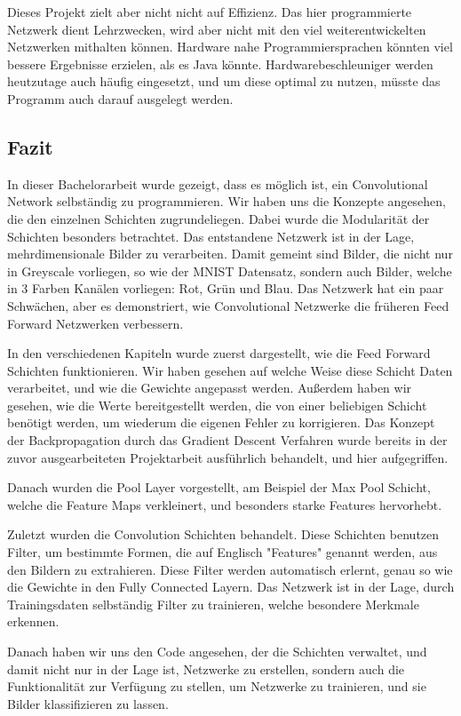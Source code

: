 \documentclass[12pt]{article}
\begin{document}
Dieses Projekt zielt aber nicht nicht auf Effizienz. Das hier programmierte Netzwerk dient Lehrzwecken, wird aber nicht mit den viel weiterentwickelten Netzwerken mithalten können. Hardware nahe Programmiersprachen könnten viel bessere Ergebnisse erzielen, als es Java könnte. Hardwarebeschleuniger werden heutzutage auch häufig eingesetzt, und um diese optimal zu nutzen, müsste das Programm auch darauf ausgelegt werden.

\subsection{Fazit}
In dieser Bachelorarbeit wurde gezeigt, dass es möglich ist, ein Convolutional Network selbständig zu programmieren. Wir haben uns die Konzepte angesehen, die den einzelnen Schichten zugrundeliegen. Dabei wurde die Modularität der Schichten besonders betrachtet. Das entstandene Netzwerk ist in der Lage, mehrdimensionale Bilder zu verarbeiten. Damit gemeint sind Bilder, die nicht nur in Greyscale vorliegen, so wie der MNIST Datensatz, sondern auch Bilder, welche in 3 Farben Kanälen vorliegen: Rot, Grün und Blau. Das Netzwerk hat ein paar Schwächen, aber es demonstriert, wie Convolutional Netzwerke die früheren Feed Forward Netzwerken verbessern.

In den verschiedenen Kapiteln wurde zuerst dargestellt, wie die Feed Forward Schichten funktionieren. Wir haben gesehen auf welche Weise diese Schicht Daten verarbeitet, und wie die Gewichte angepasst werden. Außerdem haben wir gesehen, wie die Werte bereitgestellt werden, die von einer beliebigen Schicht benötigt werden, um wiederum die eigenen Fehler zu korrigieren. Das Konzept der Backpropagation durch das Gradient Descent Verfahren wurde bereits in der zuvor ausgearbeiteten Projektarbeit ausführlich behandelt, und hier aufgegriffen.

Danach wurden die Pool Layer vorgestellt, am Beispiel der Max Pool Schicht, welche die Feature Maps verkleinert, und besonders starke Features hervorhebt.

Zuletzt wurden die Convolution Schichten behandelt. Diese Schichten benutzen Filter, um bestimmte Formen, die auf Englisch "Features" genannt werden, aus den Bildern zu extrahieren. Diese Filter werden automatisch erlernt, genau so wie die Gewichte in den Fully Connected Layern. Das Netzwerk ist in der Lage, durch Trainingsdaten selbständig Filter zu trainieren, welche besondere Merkmale erkennen. 

Danach haben wir uns den Code angesehen, der die Schichten verwaltet, und damit nicht nur in der Lage ist, Netzwerke zu erstellen, sondern auch die Funktionalität zur Verfügung zu stellen, um Netzwerke zu trainieren, und sie Bilder klassifizieren zu lassen.
\end{document}
